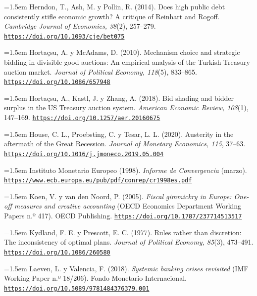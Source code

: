 \documentclass[10pt,a4paper]{article}
\begin{document}
\noindent\hangindent=1.5em Herndon, T., Ash, M. y Pollin, R. (2014). Does high public debt consistently stifle economic growth? A critique of Reinhart and Rogoff. \textit{Cambridge Journal of Economics, 38}(2), 257--279. \href{https://doi.org/10.1093/cje/bet075}{\nolinkurl{https://doi.org/10.1093/cje/bet075}}

\noindent\hangindent=1.5em Hortaçsu, A. y McAdams, D. (2010). Mechanism choice and strategic bidding in divisible good auctions: An empirical analysis of the Turkish Treasury auction market. \textit{Journal of Political Economy, 118}(5), 833--865. \href{https://doi.org/10.1086/657948}{\nolinkurl{https://doi.org/10.1086/657948}}

\noindent\hangindent=1.5em Hortaçsu, A., Kastl, J. y Zhang, A. (2018). Bid shading and bidder surplus in the US Treasury auction system. \textit{American Economic Review, 108}(1), 147--169. \href{https://doi.org/10.1257/aer.20160675}{\nolinkurl{https://doi.org/10.1257/aer.20160675}}

\noindent\hangindent=1.5em House, C. L., Proebsting, C. y Tesar, L. L. (2020). Austerity in the aftermath of the Great Recession. \textit{Journal of Monetary Economics, 115}, 37--63. \href{https://doi.org/10.1016/j.jmoneco.2019.05.004}{\nolinkurl{https://doi.org/10.1016/j.jmoneco.2019.05.004}}

\noindent\hangindent=1.5em Instituto Monetario Europeo (1998). \textit{Informe de Convergencia} (marzo). \href{https://www.ecb.europa.eu/pub/pdf/conrep/cr1998es.pdf}{\nolinkurl{https://www.ecb.europa.eu/pub/pdf/conrep/cr1998es.pdf}}

\noindent\hangindent=1.5em Koen, V. y van den Noord, P. (2005). \textit{Fiscal gimmickry in Europe: One-off measures and creative accounting} (OECD Economics Department Working Papers n.º 417). OECD Publishing. \href{https://doi.org/10.1787/237714513517}{\nolinkurl{https://doi.org/10.1787/237714513517}}

\noindent\hangindent=1.5em Kydland, F. E. y Prescott, E. C. (1977). Rules rather than discretion: The inconsistency of optimal plans. \textit{Journal of Political Economy, 85}(3), 473--491. \href{https://doi.org/10.1086/260580}{\nolinkurl{https://doi.org/10.1086/260580}}

\noindent\hangindent=1.5em Laeven, L. y Valencia, F. (2018). \textit{Systemic banking crises revisited} (IMF Working Paper n.º 18/206). Fondo Monetario Internacional. \href{https://doi.org/10.5089/9781484376379.001}{\nolinkurl{https://doi.org/10.5089/9781484376379.001}}
\end{document}
